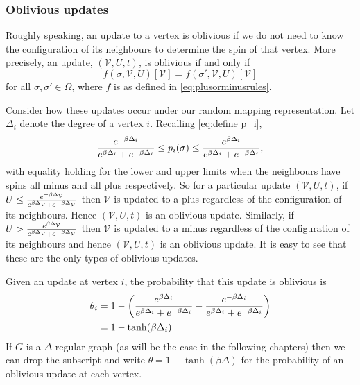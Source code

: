	

	\subsubsection{Oblivious updates}
	\label{sec:oblivious updates}

	Roughly speaking, an update to a vertex is oblivious if we do not need to know the configuration of its neighbours to determine the spin of that vertex. More precisely, an update, $(\mathcal{V}, U, t)$, is oblivious if and only if
	\begin{equation}
		f(\sigma, \mathcal{V}, U)[\mathcal{V}] = f(\sigma', \mathcal{V}, U)[\mathcal{V}]
	\end{equation}
	for all $\sigma, \sigma' \in \Omega$, where $f$ is as defined in \eqref{eq:plusorminusrules}.

	Consider how these updates occur under our random mapping representation. Let $\Delta_i$ denote the degree of a vertex $i$. Recalling \eqref{eq:define p_i},
	\begin{equation}
		\frac{e^{-\beta \Delta_i}}{e^{\beta \Delta_i} + e^{-\beta \Delta_i}} \leq p_i(\sigma) \leq \frac{e^{\beta \Delta_i}}{e^{\beta \Delta_i} + e^{-\beta \Delta_i}},
	\end{equation}
	with equality holding for the lower and upper limits when the neighbours have spins all minus and all plus respectively. So for a particular update $(\mathcal{V}, U, t)$, if $U \leq \frac{e^{-\beta \Delta_\mathcal{V}}}{e^{\beta \Delta_\mathcal{V}} + e^{-\beta \Delta_\mathcal{V}}}$ then $\mathcal{V}$ is updated to a plus regardless of the configuration of its neighbours. Hence $(\mathcal{V}, U, t)$ is an oblivious update. Similarly, if $U > \frac{e^{\beta \Delta_\mathcal{V}}}{e^{\beta \Delta_\mathcal{V}} + e^{-\beta \Delta_\mathcal{V}}}$ then $\mathcal{V}$ is updated to a minus regardless of the configuration of its neighbours and hence $(\mathcal{V}, U, t)$ is an oblivious update. It is easy to see that these are the only types of oblivious updates.
	
	Given an update at vertex $i$, the probability that this update is oblivious is
	\begin{align}
		\theta_i &= 1 - \left(\frac{e^{\beta \Delta_i}}{e^{\beta \Delta_i} + e^{-\beta \Delta_i}} - \frac{e^{-\beta \Delta_i}}{e^{\beta \Delta_i} + e^{-\beta \Delta_i}}\right)\\
			&= 1 - \tanh(\beta \Delta_i).
	\end{align}
	If $G$ is a $\Delta$-regular graph (as will be the case in the following chapters) then we can drop the subscript and write $\theta = 1 - \tanh(\beta \Delta)$ for the probability of an oblivious update at each vertex.

